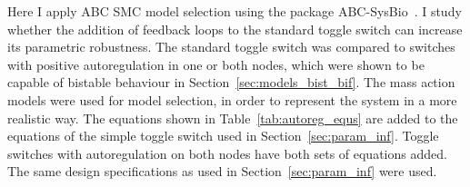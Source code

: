

Here I apply ABC SMC model selection using the package ABC-SysBio~\autocite{Liepe:2010eg}. I study whether the addition of feedback loops to the standard toggle switch can increase its parametric robustness. The standard toggle switch was compared to switches with positive autoregulation in one or both nodes, which were shown to be capable of bistable behaviour in Section~\ref{sec:models_bist_bif}. The mass action models were used for model selection, in order to represent the system in a more realistic way. The equations shown in Table~\ref{tab:autoreg_equs} are added to the equations of the simple toggle switch used in Section~\ref{sec:param_inf}. Toggle switches with autoregulation on both nodes have both sets of equations added. The same design specifications as used in Section~\ref{sec:param_inf} were used.



